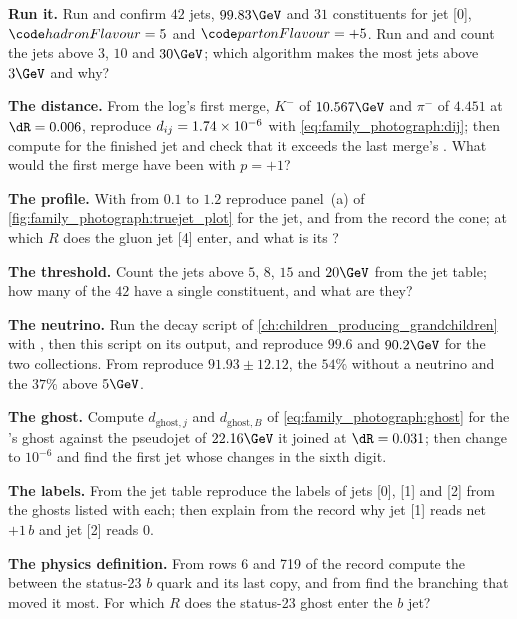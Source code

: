 \begin{exercises}
\item \textbf{Run it.} Run  and confirm $42$
  \akfour jets, $99.83\GeV$ and $31$ constituents for jet [0],
  $\hadflav=5$ and $\partflav=+5$. Run  and
   and count the jets above $3$, $10$ and $30\GeV$; which
  algorithm makes the most jets above $3\GeV$ and why?
\item \textbf{The distance.} From the log's first merge, $K^-$ of
  $10.567\GeV$ and $\pi^-$ of $4.451$ at $\dR=0.006$, reproduce
  $d_{ij}=1.74\times10^{-6}$ with \cref{eq:family_photograph:dij}; then
  compute \diB for the finished jet and check that it exceeds the last
  merge's \dij. What would the first merge have been with $p=+1$?
\item \textbf{The profile.} With  from $0.1$ to $1.2$
  reproduce panel~(a) of \cref{fig:family_photograph:truejet_plot} for
  the jet, and from the record the cone; at which $R$ does the gluon jet
  [4] enter, and what is its \pt?
\item \textbf{The threshold.} Count the \akfour jets above $5$, $8$,
  $15$ and $20\GeV$ from the jet table; how many of the $42$ have a
  single constituent, and what are they?
\item \textbf{The neutrino.} Run the decay script of
  \cref{ch:children_producing_grandchildren} with , then
  this script on its output, and reproduce $99.6$ and $90.2\GeV$ for the
  two \akfour collections. From 
  reproduce $91.93\pm12.12$, the $54\%$ without a neutrino and the $37\%$
  above $5\GeV$.
\item \textbf{The ghost.} Compute $d_{\mathrm{ghost},j}$ and
  $d_{\mathrm{ghost},B}$ of \cref{eq:family_photograph:ghost} for the
  \Bbar's ghost against the pseudojet of $22.16\GeV$ it joined at
  $\dR=0.031$; then change  to $10^{-6}$ and find
  the first jet whose \pt changes in the sixth digit.
\item \textbf{The labels.} From the jet table reproduce the labels of
  jets [0], [1] and [2] from the ghosts listed with each; then explain
  from the record why jet [1] reads net $+1\,b$ and jet [2] reads $0$.
\item \textbf{The physics definition.} From rows 6 and 719 of the record
  compute the \dR between the status-23 $b$ quark and its last copy, and
  from  find the branching that moved it most. For
  which $R$ does the status-23 ghost enter the $b$ jet?

\end{exercises}
